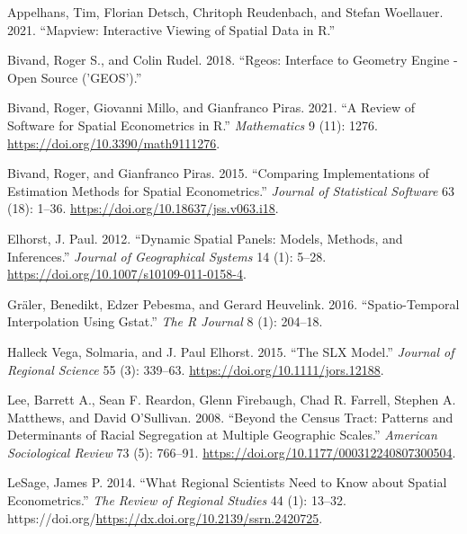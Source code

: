 \documentclass[
  letterpaper,
  DIV=11,
  numbers=noendperiod]{scrreprt}
\newlength{\cslhangindent}
\newlength{\cslentryspacingunit} %
\newenvironment{CSLReferences}[2] %
 {%
  \setlength{\parindent}{0pt}
  \ifodd #1
  \let\oldpar\par
  \def\par{\hangindent=\cslhangindent\oldpar}
  \fi
  \setlength{\parskip}{#2\cslentryspacingunit}
 }%
 {}
\begin{document}
\hypertarget{refs}{}
\begin{CSLReferences}{1}{0}
\leavevmode{}%
Appelhans, Tim, Florian Detsch, Chritoph Reudenbach, and Stefan
Woellauer. 2021. {``Mapview: {Interactive Viewing} of {Spatial Data} in
{R}.''}

\leavevmode{}%
Bivand, Roger S., and Colin Rudel. 2018. {``Rgeos: {Interface} to
{Geometry Engine} - {Open Source} ('{GEOS}').''}

\leavevmode{}%
Bivand, Roger, Giovanni Millo, and Gianfranco Piras. 2021. {``A {Review}
of {Software} for {Spatial Econometrics} in {R}.''} \emph{Mathematics} 9
(11): 1276. \url{https://doi.org/10.3390/math9111276}.

\leavevmode{}%
Bivand, Roger, and Gianfranco Piras. 2015. {``Comparing
{Implementations} of {Estimation Methods} for {Spatial Econometrics}.''}
\emph{Journal of Statistical Software} 63 (18): 1--36.
\url{https://doi.org/10.18637/jss.v063.i18}.

\leavevmode{}%
Elhorst, J. Paul. 2012. {``Dynamic Spatial Panels: Models, Methods, and
Inferences.''} \emph{Journal of Geographical Systems} 14 (1): 5--28.
\url{https://doi.org/10.1007/s10109-011-0158-4}.

\leavevmode{}%
Gräler, Benedikt, Edzer Pebesma, and Gerard Heuvelink. 2016.
{``Spatio-{Temporal Interpolation} Using Gstat.''} \emph{The R Journal}
8 (1): 204--18.

\leavevmode{}%
Halleck Vega, Solmaria, and J. Paul Elhorst. 2015. {``The {SLX
Model}.''} \emph{Journal of Regional Science} 55 (3): 339--63.
\url{https://doi.org/10.1111/jors.12188}.

\leavevmode{}%
Lee, Barrett A., Sean F. Reardon, Glenn Firebaugh, Chad R. Farrell,
Stephen A. Matthews, and David O'Sullivan. 2008. {``Beyond the {Census
Tract}: {Patterns} and {Determinants} of {Racial Segregation} at
{Multiple Geographic Scales}.''} \emph{American Sociological Review} 73
(5): 766--91. \url{https://doi.org/10.1177/000312240807300504}.

\leavevmode{}%
LeSage, James P. 2014. {``What {Regional Scientists Need} to {Know}
about {Spatial Econometrics}.''} \emph{The Review of Regional Studies}
44 (1): 13--32.
https://doi.org/\url{https://dx.doi.org/10.2139/ssrn.2420725}.


\end{CSLReferences}
\end{document}
